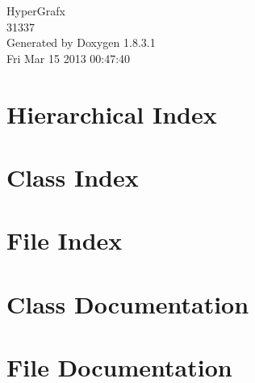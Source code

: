\documentclass{book}
\begin{document}
\hypersetup{pageanchor=false,citecolor=blue}
\begin{titlepage}
\vspace*{7cm}
\begin{center}
{\Large Hyper\-Grafx \\[1ex]\large 31337 }\\
\vspace*{1cm}
{\large Generated by Doxygen 1.8.3.1}\\
\vspace*{0.5cm}
{\small Fri Mar 15 2013 00:47:40}\\
\end{center}
\end{titlepage}
\clearemptydoublepage
{}
\tableofcontents
\clearemptydoublepage
{}
\hypersetup{pageanchor=true,citecolor=blue}
\chapter{Hierarchical Index}

\chapter{Class Index}

\chapter{File Index}

\chapter{Class Documentation}






















\chapter{File Documentation}






















\printindex
\end{document}
